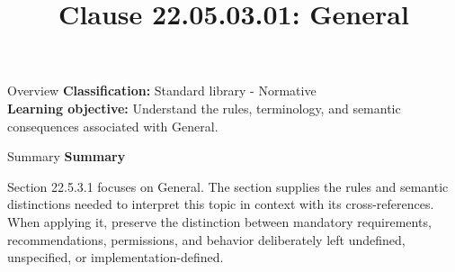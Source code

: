 \documentclass[10pt,letterpaper]{article}
\title{Clause 22.05.03.01: General}
\author{}
\date{}
\begin{document}
\maketitle
\begin{CornellOverviewBox}{Overview}
\textbf{Classification:} Standard library - Normative\\[2pt]
\textbf{Learning objective:} Understand the rules, terminology, and semantic consequences associated with General.
\end{CornellOverviewBox}\begin{CornellSummaryBox}{Summary}
{\sffamily\bfseries\color{Accent} Summary}\par\vspace{3pt}Section 22.5.3.1 focuses on General. The section supplies the rules and semantic distinctions needed to interpret this topic in context with its cross-references. When applying it, preserve the distinction between mandatory requirements, recommendations, permissions, and behavior deliberately left undefined, unspecified, or implementation-defined.
\end{CornellSummaryBox}
\end{document}
